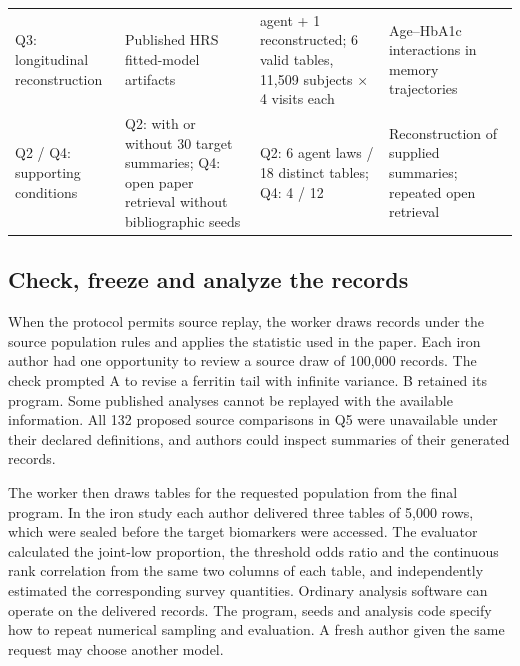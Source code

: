 \documentclass[sigconf,review]{acmart}
\begin{document}
\begin{table}[tp]
\begin{tabularx}{\textwidth}{@{}>{\raggedright\arraybackslash}X>{\raggedright\arraybackslash}X>{\raggedright\arraybackslash}X>{\raggedright\arraybackslash}X@{}}
Q3: longitudinal reconstruction & Published HRS fitted-model artifacts & 1 agent + 1 reconstructed; 6 valid tables, 11,509 subjects × 4 visits each & Age–\allowbreak{}HbA1c interactions in memory trajectories \\

Q2 / Q4: supporting conditions & Q2: with or without 30 target summaries; Q4: open paper retrieval without bibliographic seeds & Q2: 6 agent laws / 18 distinct tables; Q4: 4 / 12 & Reconstruction of supplied summaries; repeated open retrieval \\

\bottomrule

\end{tabularx}

\end{table}

\subsection{Check, freeze and analyze the records}

When the protocol permits source replay, the worker draws records under the source population rules and applies the statistic used in the paper. Each iron author had one opportunity to review a source draw of 100,000 records. The check prompted A to revise a ferritin tail with infinite variance. B retained its program. Some published analyses cannot be replayed with the available information. All 132 proposed source comparisons in Q5 were unavailable under their declared definitions, and authors could inspect summaries of their generated records.


The worker then draws tables for the requested population from the final program. In the iron study each author delivered three tables of 5,000 rows, which were sealed before the target biomarkers were accessed. The evaluator calculated the joint-low proportion, the threshold odds ratio and the continuous rank correlation from the same two columns of each table, and independently estimated the corresponding survey quantities. Ordinary analysis software can operate on the delivered records. The program, seeds and analysis code specify how to repeat numerical sampling and evaluation. A fresh author given the same request may choose another model.
\end{document}
